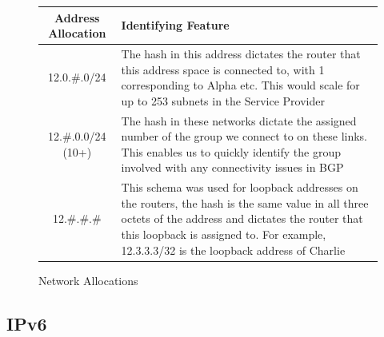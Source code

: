 \begin{figure}[!ht]
	\caption{Network Allocations}
	\label{figure:network-alloc-2}
	\centering
	\begin{tabular}{|c|p{8cm}|}
		\hline \textbf{Address Allocation} & \textbf{Identifying Feature} \\
		\hline 12.0.\#.0/24 & The hash in this address dictates the router that this address space is connected to, with 1 corresponding to Alpha etc. This would scale for up to 253 subnets in the Service Provider \\
		\hline 12.\#.0.0/24 (10+) & The hash in these networks dictate the assigned number of the group we connect to on these links. This enables us to quickly identify the group involved with any connectivity issues in BGP  \\
		\hline 12.\#.\#.\# & This schema was used for loopback addresses on the routers, the hash is the same value in all three octets of the address and dictates the router that this loopback is assigned to. For example, 12.3.3.3/32 is the loopback address of Charlie \\
		\hline
	\end{tabular}
\end{figure}
\clearpage

\subsection{IPv6}